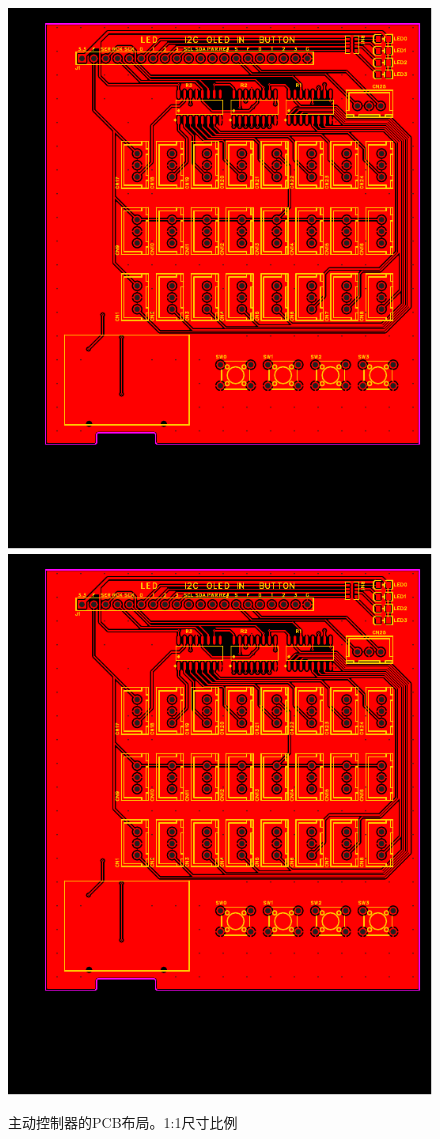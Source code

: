 \begin{figure}
    \centering
    \includegraphics[page=1]{figures/active_sync_pcb}
    \includegraphics[page=2]{figures/active_sync_pcb}
    \caption[主动控制器的PCB布局]{主动控制器的PCB布局。1:1尺寸比例}
    \label{fig:active_sync_pcb}
\end{figure}
